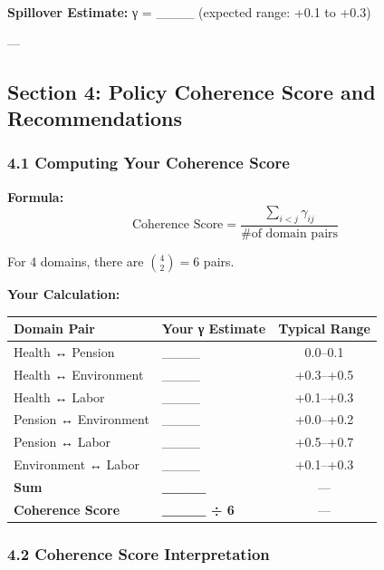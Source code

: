 \textbf{Spillover Estimate:} γ = \_\_\_\_ (expected range: +0.1 to +0.3)

---


\subsection*{Section 4: Policy Coherence Score and Recommendations}

\subsubsection*{4.1 Computing Your Coherence Score}

\textbf{Formula:}
$$\text{Coherence Score} = \frac{\sum_{i < j} \gamma_{ij}}{\text{\# of domain pairs}}$$

For 4 domains, there are $\binom{4}{2} = 6$ pairs.

\textbf{Your Calculation:}

\begin{center}
\begin{tabular}{@{}llc@{}}
\toprule
\textbf{Domain Pair} & \textbf{Your γ Estimate} & \textbf{Typical Range} \\
\midrule
Health ↔ Pension & \_\_\_\_ & 0.0–0.1 \\
Health ↔ Environment & \_\_\_\_ & +0.3–+0.5 \\
Health ↔ Labor & \_\_\_\_ & +0.1–+0.3 \\
Pension ↔ Environment & \_\_\_\_ & +0.0–+0.2 \\
Pension ↔ Labor & \_\_\_\_ & +0.5–+0.7 \\
Environment ↔ Labor & \_\_\_\_ & +0.1–+0.3 \\
\midrule
\textbf{Sum} & \textbf{\_\_\_\_} & --- \\
\textbf{Coherence Score} & \textbf{\_\_\_\_ ÷ 6} & --- \\
\midrule
\end{tabular}
\end{center}

\subsubsection*{4.2 Coherence Score Interpretation}

